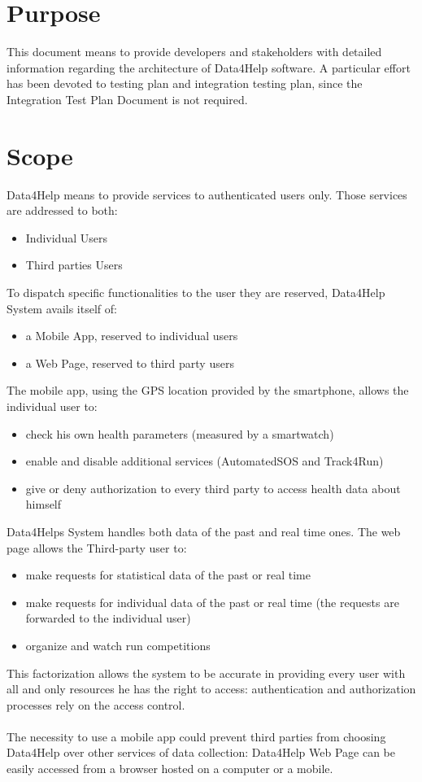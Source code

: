 \section{Purpose}
This document means to provide developers and stakeholders with detailed information regarding the architecture of Data4Help software.   
A particular effort has been devoted to testing plan and integration testing plan, since the Integration Test Plan Document is not required. 
\section{Scope}
Data4Help means to provide services to authenticated users only. Those services are addressed to both:
\begin{itemize}
\item	Individual Users
\item Third parties Users
\end{itemize}
To dispatch specific functionalities to the user they are reserved, Data4Help System avails itself of:
\begin{itemize}
\item a Mobile App, reserved to individual users
\item a Web Page, reserved to third party users
\end{itemize}
The mobile app, using the GPS location provided by the smartphone, allows the individual user to:
\begin{itemize}
\item check his own health parameters (measured by a smartwatch)
\item enable and disable additional services (AutomatedSOS and Track4Run)
\item give or deny authorization to every third party to access health data about himself
\end{itemize}
Data4Helps System handles both data of the past and real time ones.
The web page allows the Third-party user to:
\begin{itemize}
\item make requests for statistical data of the past or real time
\item make requests for individual data of the past or real time (the requests are forwarded to the individual user)
\item organize and watch run competitions
\end{itemize}
This factorization allows the system to be accurate in providing every user with all and only resources he has the right to access: authentication and authorization processes rely on the access control. \\ \\
The necessity to use a mobile app could prevent third parties from choosing Data4Help over other services of data collection: Data4Help Web Page can be easily accessed from a browser hosted on a computer or a mobile. 

